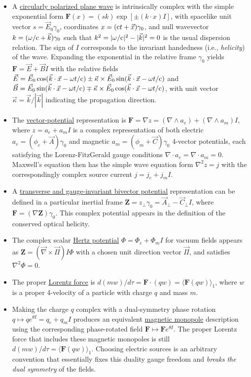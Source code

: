 \documentclass[1p,sort&compress]{elsarticle}
\numberwithin{equation}{section}
\newcommand{\rv}[1]{\vec{#1}}
\newcommand{\bv}[1]{\mathbf{#1}}
\newcommand{\mean}[1]{\langle #1 \rangle}
\newcommand{\cc}{{\rm c}}
\begin{document}
\begin{itemize}
  \item A \uline{circularly polarized plane wave} is intrinsically complex with the simple exponential form $\bv{F}(x) = (sk)\exp[\pm(k\cdot x)I]$, with spacelike unit vector $s=\rv{E}_0\gamma_0$, coordinates $x = (\cc t + \rv{x})\gamma_0$, and null wavevector $k=(\omega/\cc +\rv{k})\gamma_0$ such that $k^2 = |\omega/\cc|^2 - |\rv{k}|^2 = 0$ is the usual dispersion relation.  The sign of $I$ corresponds to the invariant handedness (i.e., \emph{helicity}) of the wave.  Expanding the exponential in the relative frame $\gamma_0$ yields $\bv{F} = \rv{E} + \rv{B}I$ with the relative fields  $\rv{E} = \rv{E}_0\cos(\rv{k}\cdot\rv{x} - \omega t/\cc) \pm \rv{\kappa}\times\rv{E}_0\sin(\rv{k}\cdot\rv{x}-\omega t/\cc)$ and $\rv{B} = \rv{E}_0\sin(\rv{k}\cdot\rv{x}-\omega t/\cc) \mp \rv{\kappa}\times\rv{E}_0\cos(\rv{k}\cdot\rv{x} - \omega t/\cc)$, with unit vector $\rv{\kappa}=\rv{k}/|\rv{k}|$ indicating the propagation direction.  
  \item The \uline{vector-potential} representation is $\bv{F} = \nabla z = (\nabla\wedge a_e) + (\nabla\wedge a_m)I$, where $z = a_e + a_m I$ is a complex representation of both electric $a_e = (\phi_e + \rv{A})\gamma_0$ and magnetic $a_m = (\phi_m + \rv{C})\gamma_0$ 4-vector potentials, each satisfying the Lorenz-FitzGerald gauge conditions $\nabla\cdot a_e = \nabla\cdot a_m = 0$.  Maxwell's equation then has the simple wave equation form $\nabla^2 z = j$ with the correspondingly complex source current $j = j_e + j_m I$.
  \item A \uline{transverse and gauge-invariant bivector potential} representation can be defined in a particular inertial frame $\bv{Z} = z_\perp \gamma_0 = \rv{A}_\perp - \rv{C}_\perp I$, where $\bv{F} = (\nabla \bv{Z})\gamma_0$.  This complex potential appears in the definition of the conserved optical helicity.
  \item The complex scalar \uline{Hertz potential} $\Phi = \Phi_e + \Phi_m I$ for vacuum fields appears as $\bv{Z} = (\rv{\nabla}\times\rv{\Pi})I \Phi$ with a chosen unit direction vector $\rv{\Pi}$, and satisfies $\nabla^2 \Phi = 0$.
  \item The proper \uline{Lorentz force} is $d(mw)/d\tau = \bv{F}\cdot(qw) = \mean{\bv{F}(qw)}_1$, where $w$ is a proper 4-velocity of a particle with charge $q$ and mass $m$.
  \item Making the charge $q$ complex with a dual-symmetry phase rotation $q \mapsto qe^{\theta I} = q_e + q_m I$ produces an equivalent \uline{magnetic monopole} description using the corresponding phase-rotated field $\bv{F}\mapsto \bv{F}e^{\theta I}$.  The proper Lorentz force that includes these magnetic monopoles is still $d(mw)/d\tau = \mean{\bv{F}(qw)}_1$.  Choosing electric sources is an arbitrary convention that essentially fixes this duality gauge freedom and \emph{breaks the dual symmetry} of the fields.

\end{itemize}
\end{document}
